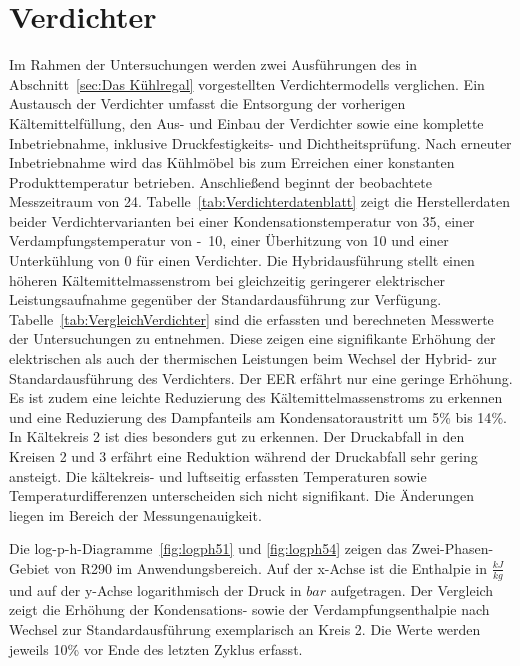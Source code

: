 \section{Verdichter}
\label{sec:Verdichter}

Im Rahmen der Untersuchungen werden zwei Ausführungen des in Abschnitt~\ref{sec:Das Kühlregal} vorgestellten Verdichtermodells verglichen. 
Ein Austausch der Verdichter umfasst die Entsorgung der vorherigen Kältemittelfüllung, den Aus- und Einbau der Verdichter sowie eine komplette Inbetriebnahme, inklusive Druckfestigkeits- und Dichtheitsprüfung. Nach erneuter Inbetriebnahme wird das Kühlmöbel bis zum Erreichen einer konstanten Produkttemperatur betrieben. Anschließend beginnt der beobachtete Messzeitraum von \unit{24}{\hour}. \newline
Tabelle~\ref{tab:Verdichterdatenblatt} zeigt die Herstellerdaten beider Verdichtervarianten bei einer Kondensationstemperatur von \unit{35}{\celsius}, einer Verdampfungstemperatur von \unit{-10}{\celsius}, einer Überhitzung von \unit{10}{\kelvin} und einer Unterkühlung von \unit{0}{\kelvin} für einen Verdichter. Die Hybridausführung stellt einen höheren Kältemittelmassenstrom bei gleichzeitig geringerer elektrischer Leistungsaufnahme gegenüber der Standardausführung zur Verfügung. \newline
Tabelle~\ref{tab:VergleichVerdichter} sind die erfassten und berechneten Messwerte der Untersuchungen zu entnehmen. Diese zeigen eine signifikante Erhöhung der elektrischen als auch der thermischen Leistungen beim Wechsel der Hybrid- zur Standardausführung des Verdichters. Der EER erfährt nur eine geringe Erhöhung. Es ist zudem eine leichte Reduzierung des Kältemittelmassenstroms zu erkennen und eine Reduzierung des Dampfanteils am Kondensatoraustritt um \unit{5}{\%} bis \unit{14}{\%}. In Kältekreis 2 ist dies besonders gut zu erkennen. Der Druckabfall in den Kreisen 2 und 3 erfährt eine Reduktion während der Druckabfall sehr gering ansteigt. Die kältekreis- und luftseitig erfassten Temperaturen sowie Temperaturdifferenzen unterscheiden sich nicht signifikant. Die Änderungen liegen im Bereich der Messungenauigkeit. \newline
 
Die log-p-h-Diagramme~\ref{fig:logph51} und \ref{fig:logph54} zeigen das Zwei-Phasen-Gebiet von R290 im Anwendungsbereich. Auf der x-Achse ist die Enthalpie in $\frac{kJ}{kg}$ und auf der y-Achse logarithmisch der Druck in $bar$ aufgetragen. Der Vergleich zeigt die Erhöhung der Kondensations- sowie der Verdampfungsenthalpie nach Wechsel zur Standardausführung exemplarisch an Kreis 2. Die Werte werden jeweils \unit{10}{\%} vor Ende des letzten Zyklus erfasst.



